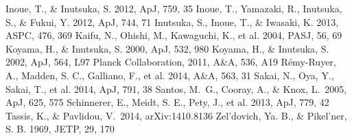 \begin{thebibliography}{99}
\begin{multicols}{2}
{
	Inoue, T., \& Inutsuka, S. 2012, ApJ, 759, 35
	Inoue, T., Yamazaki, R., Inutsuka, S., \& Fukui, Y. 2012, ApJ, 744, 71
	Inutsuka, S., Inoue, T., \& Iwasaki, K. 2013, ASPC, 476, 369
	Kaifu, N., Ohishi, M., Kawaguchi, K., et al. 2004, PASJ, 56, 69
	Koyama, H., \& Inutsuka, S. 2000, ApJ, 532, 980
	Koyama, H., \& Inutsuka, S. 2002, ApJ, 564, L97
	Planck Collaboration, 2011, A\&A, 536, A19
	R\'emy-Ruyer, A., Madden, S. C., Galliano, F., et al. 2014, A\&A, 563, 31
	Sakai, N., Oya, Y., Sakai, T., et al. 2014, ApJ, 791, 38
	Santos, M.~G., Cooray, A., \& Knox, L.\ 2005, ApJ, 625, 575 
	Schinnerer, E., Meidt, S. E., Pety, J., et al. 2013, ApJ, 779, 42
	Tassis, K., \& Pavlidou, V.\ 2014, arXiv:1410.8136
	Zel'dovich, Ya. B., \& Pikel'ner, S. B. 1969, JETP, 29, 170
}\end{multicols}
\end{thebibliography}


